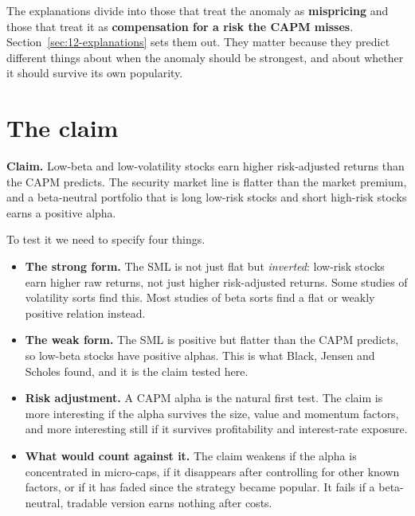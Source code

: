 The explanations divide into those that treat the anomaly as \textbf{mispricing} and those that treat it as \textbf{compensation for a risk the CAPM misses}. Section~\ref{sec:12-explanations} sets them out. They matter because they predict different things about when the anomaly should be strongest, and about whether it should survive its own popularity.

\section{The claim}
\label{sec:12-claim}

\begin{callout}
\textbf{Claim.} Low-beta and low-volatility stocks earn higher risk-adjusted returns than the CAPM predicts. The security market line is flatter than the market premium, and a beta-neutral portfolio that is long low-risk stocks and short high-risk stocks earns a positive alpha.
\end{callout}

To test it we need to specify four things.

\begin{itemize}
  \item \textbf{The strong form.} The SML is not just flat but \emph{inverted}: low-risk stocks earn higher raw returns, not just higher risk-adjusted returns. Some studies of volatility sorts find this. Most studies of beta sorts find a flat or weakly positive relation instead.
  \item \textbf{The weak form.} The SML is positive but flatter than the CAPM predicts, so low-beta stocks have positive alphas. This is what Black, Jensen and Scholes found, and it is the claim tested here.
  \item \textbf{Risk adjustment.} A CAPM alpha is the natural first test. The claim is more interesting if the alpha survives the size, value and momentum factors, and more interesting still if it survives profitability and interest-rate exposure.
  \item \textbf{What would count against it.} The claim weakens if the alpha is concentrated in micro-caps, if it disappears after controlling for other known factors, or if it has faded since the strategy became popular. It fails if a beta-neutral, tradable version earns nothing after costs.
\end{itemize}

